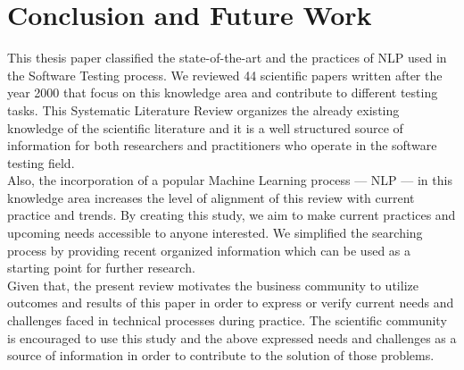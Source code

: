 \chapter{Conclusion and Future Work}

This thesis paper classified the state-of-the-art and the practices of NLP used in the Software Testing process. We reviewed 44 scientific papers written after the year 2000 that focus on this 
knowledge area and contribute to different testing tasks. This Systematic Literature Review organizes the already existing knowledge of the scientific literature and it is a well structured source of 
information for both researchers and practitioners who operate in the software testing field.\\

Also, the incorporation of a popular Machine Learning process --- NLP --- in this knowledge area increases the level of alignment of this review with current practice and trends. By creating this study, 
we aim to make current practices and upcoming needs accessible to anyone interested. We simplified the searching process by providing recent organized information which can be used as a starting point 
for further research.\\

Given that, the present review motivates the business community to utilize outcomes and results of this paper in order to express or verify current needs and challenges faced in technical processes during 
practice. The scientific community is encouraged to use this study and the above expressed needs and challenges as a source of information in order to contribute to the solution of those problems.
